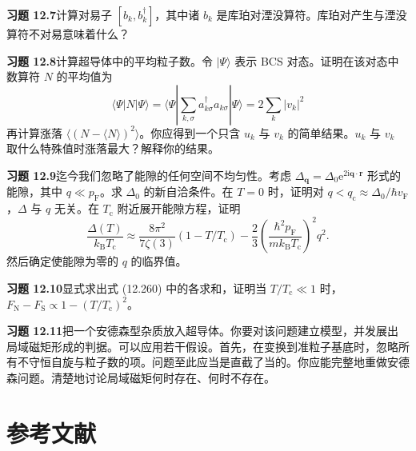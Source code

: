\textbf{习题 12.7}\quad 计算对易子 $[b_{k},b_{k}^{\dagger}]$，其中诸 $b_{k}$ 是库珀对湮没算符。库珀对产生与湮没算符不对易意味着什么？

\textbf{习题 12.8}\quad 计算超导体中的平均粒子数。令 $|\Psi\rangle$ 表示 BCS 对态。证明在该对态中数算符 $N$ 的平均值为
\begin{equation*}
\langle\Psi|N|\Psi\rangle=\langle\Psi|\sum_{k,\sigma}a_{k\sigma}^{\dagger}a_{k\sigma}|\Psi\rangle=2\sum_{k}|v_{k}|^{2}\tag{12.329}
\end{equation*}
再计算涨落 $\langle\left(N-\langle N\rangle\right)^{2}\rangle$。你应得到一个只含 $u_{k}$ 与 $v_{k}$ 的简单结果。$u_{k}$ 与 $v_{k}$ 取什么特殊值时涨落最大？解释你的结果。

\textbf{习题 12.9}\quad 迄今我们忽略了能隙的任何空间不均匀性。考虑 $\Delta_{\mathbf{q}}=\Delta_{0}\mathrm{e}^{2\mathrm{i}\mathbf{q}\cdot\mathbf{r}}$ 形式的能隙，其中 $q\ll p_{\mathrm{F}}$。求 $\Delta_{0}$ 的新自洽条件。在 $T=0$ 时，证明对 $q<q_{\mathrm{c}}\approx\Delta_{0}/\hbar v_{\mathrm{F}}$，$\Delta$ 与 $q$ 无关。在 $T_{\mathrm{c}}$ 附近展开能隙方程，证明
\begin{equation*}
\frac{\Delta(T)}{k_{\mathrm{B}}T_{\mathrm{c}}}\approx\frac{8\pi^{2}}{7\zeta(3)}\left(1-T/T_{\mathrm{c}}\right)-\frac{2}{3}\left(\frac{\hbar^{2}p_{\mathrm{F}}}{mk_{\mathrm{B}}T_{\mathrm{c}}}\right)^{2}q^{2}.\tag{12.330}
\end{equation*}
然后确定使能隙为零的 $q$ 的临界值。

\textbf{习题 12.10}\quad 显式求出式 (12.260) 中的各求和，证明当 $T/T_{\mathrm{c}}\ll 1$ 时，$F_{\mathrm{N}}-F_{\mathrm{S}}\propto 1-\left(T/T_{\mathrm{c}}\right)^{2}$。

\textbf{习题 12.11}\quad 把一个安德森型杂质放入超导体。你要对该问题建立模型，并发展出局域磁矩形成的判据。可以应用若干假设。首先，在变换到准粒子基底时，忽略所有不守恒自旋与粒子数的项。问题至此应当是直截了当的。你应能完整地重做安德森问题。清楚地讨论局域磁矩何时存在、何时不存在。

\section*{参考文献}

